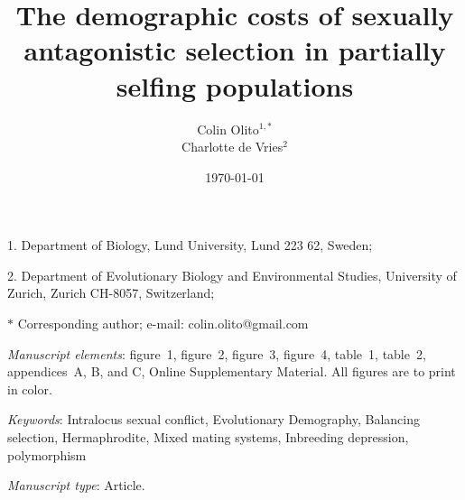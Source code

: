 \documentclass[11pt,draft]{article}
\begin{document}
\title{The demographic costs of sexually antagonistic selection in partially selfing populations}





\author{Colin Olito$^{1,\ast}$ \\ 
Charlotte de Vries$^{2}$}
\date{\today}
\maketitle

\noindent{} 1. Department of Biology, Lund University, Lund 223 62, Sweden;

\noindent{} 2.  Department of Evolutionary Biology and Environmental Studies, University of Zurich, Zurich CH-8057, Switzerland;

\noindent{} $\ast$ Corresponding author; e-mail: colin.olito@gmail.com

\bigskip

\textit{Manuscript elements}: figure~1, figure~2, figure~3, figure~4, table~1, table~2, appendices~A, B, and C, Online Supplementary Material. All figures are to print in color.

\bigskip

\textit{Keywords}: Intralocus sexual conflict, Evolutionary Demography, Balancing selection, Hermaphrodite, Mixed mating systems, Inbreeding depression, polymorphism 

\bigskip

\textit{Manuscript type}: Article. %

\bigskip

\end{document}
